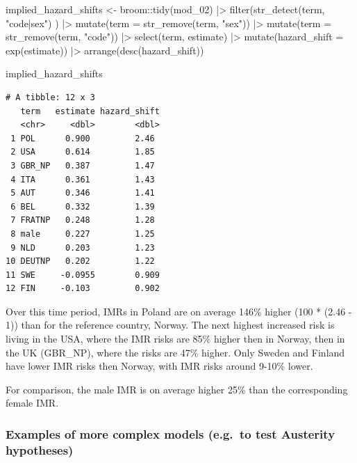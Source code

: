 \documentclass[
  letterpaper,
  DIV=11,
  numbers=noendperiod]{scrartcl}
\newenvironment{Shaded}{\begin{snugshade}}{\end{snugshade}}
\newcommand{\AttributeTok}[1]{\textcolor[rgb]{0.40,0.45,0.13}{#1}}
\newcommand{\FunctionTok}[1]{\textcolor[rgb]{0.28,0.35,0.67}{#1}}
\newcommand{\NormalTok}[1]{\textcolor[rgb]{0.00,0.23,0.31}{#1}}
\newcommand{\OtherTok}[1]{\textcolor[rgb]{0.00,0.23,0.31}{#1}}
\newcommand{\SpecialCharTok}[1]{\textcolor[rgb]{0.37,0.37,0.37}{#1}}
\newcommand{\StringTok}[1]{\textcolor[rgb]{0.13,0.47,0.30}{#1}}
\begin{document}
\begin{Shaded}
\begin{Highlighting}[]
\NormalTok{implied\_hazard\_shifts }\OtherTok{\textless{}{-}} 
\NormalTok{  broom}\SpecialCharTok{::}\FunctionTok{tidy}\NormalTok{(mod\_02) }\SpecialCharTok{|\textgreater{}} 
    \FunctionTok{filter}\NormalTok{(}\FunctionTok{str\_detect}\NormalTok{(term, }\StringTok{"code|sex"}\NormalTok{) ) }\SpecialCharTok{|\textgreater{}} 
    \FunctionTok{mutate}\NormalTok{(}\AttributeTok{term =} \FunctionTok{str\_remove}\NormalTok{(term, }\StringTok{"sex"}\NormalTok{)) }\SpecialCharTok{|\textgreater{}} 
    \FunctionTok{mutate}\NormalTok{(}\AttributeTok{term =} \FunctionTok{str\_remove}\NormalTok{(term, }\StringTok{"code"}\NormalTok{)) }\SpecialCharTok{|\textgreater{}} 
    \FunctionTok{select}\NormalTok{(term, estimate) }\SpecialCharTok{|\textgreater{}} 
    \FunctionTok{mutate}\NormalTok{(}\AttributeTok{hazard\_shift =} \FunctionTok{exp}\NormalTok{(estimate)) }\SpecialCharTok{|\textgreater{}} 
    \FunctionTok{arrange}\NormalTok{(}\FunctionTok{desc}\NormalTok{(hazard\_shift)) }

\NormalTok{implied\_hazard\_shifts}
\end{Highlighting}
\end{Shaded}

\begin{verbatim}
# A tibble: 12 x 3
   term   estimate hazard_shift
   <chr>     <dbl>        <dbl>
 1 POL      0.900         2.46 
 2 USA      0.614         1.85 
 3 GBR_NP   0.387         1.47 
 4 ITA      0.361         1.43 
 5 AUT      0.346         1.41 
 6 BEL      0.332         1.39 
 7 FRATNP   0.248         1.28 
 8 male     0.227         1.25 
 9 NLD      0.203         1.23 
10 DEUTNP   0.202         1.22 
11 SWE     -0.0955        0.909
12 FIN     -0.103         0.902
\end{verbatim}

Over this time period, IMRs in Poland are on average 146\% higher (100 *
(2.46 - 1)) than for the reference country, Norway. The next highest
increased risk is living in the USA, where the IMR risks are 85\% higher
then in Norway, then in the UK (GBR\_NP), where the risks are 47\%
higher. Only Sweden and Finland have lower IMR risks then Norway, with
IMR risks around 9-10\% lower.

For comparison, the male IMR is on average higher 25\% than the
corresponding female IMR.

\hypertarget{examples-of-more-complex-models-e.g.-to-test-austerity-hypotheses}{%
\subsubsection{Examples of more complex models (e.g.~to test Austerity
hypotheses)}\label{examples-of-more-complex-models-e.g.-to-test-austerity-hypotheses}}
\end{document}

